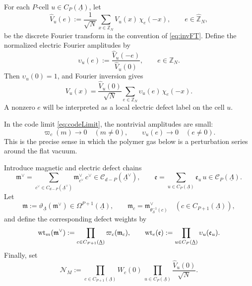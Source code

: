 For each \(P\)-cell \(u\in C_P(\underline\Lambda)\), let
\begin{equation}
	\widehat V_u(e)
	:=
	\frac{1}{\sqrt N}
	\sum_{x\in \mathbb Z_N}
	V_u(x)\,\chi_e(-x),
	\qquad
	e\in \widehat{\mathbb Z}_N,
	\label{eq:Vu-fourier-transform}
\end{equation}
be the discrete Fourier transform in the convention of \eqref{eq:invFT}. Define the normalized electric Fourier
amplitudes by
\begin{equation}
	\upsilon_u(e)
	:=
	\frac{\widehat V_u(-e)}{\widehat V_u(0)},
	\qquad
	e\in \mathbb Z_N.
	\label{eq:electric-local-amplitude}
\end{equation}
Then \(\upsilon_u(0)=1\), and Fourier inversion gives
\begin{equation}
	V_u(x)
	=
	\frac{\widehat V_u(0)}{\sqrt N}
	\sum_{e\in \mathbb Z_N}
	\upsilon_u(e)\,\chi_e(-x).
	\label{eq:V-cell-expansion}
\end{equation}
A nonzero \(e\) will be interpreted as a local electric defect label on the cell \(u\).

In the code limit \eqref{eq:codeLimit}, the nontrivial amplitudes are
small:
\begin{equation}
	\varpi_c(m)\rightarrow 0 \quad (m\neq 0),
	\qquad
	\upsilon_u(e)\rightarrow 0 \quad (e\neq 0).
	\label{eq:nontrivial-local-amplitudes-small}
\end{equation}
This is the precise sense in which the polymer gas below is a perturbation series around
the flat vacuum.

Introduce magnetic and electric defect chains
\begin{equation}
	\mathfrak m^\vee
	=
	\sum_{c^\vee\in C_{d-P}(\underline\Lambda^\vee)}
	\mathfrak m_{c^\vee}^\vee\,c^\vee
	\in \mathcal C_{d-P}(\underline\Lambda^\vee),
	\qquad
	\mathfrak e
	=
	\sum_{u\in C_P(\underline\Lambda)}
	\mathfrak e_u\,u
	\in \mathcal C_P(\underline\Lambda).
\end{equation}
Let
\begin{equation}
	\mathfrak m
	:=
	\vartheta_{\underline\Lambda}(\mathfrak m^\vee)\in \Omega^{P+1}(\underline\Lambda),
	\qquad
	\mathfrak m_c
	=
	\mathfrak m^\vee_{\theta_{\underline\Lambda}^{-1}(c)}
	\quad
	(c\in C_{P+1}(\underline\Lambda)),
\end{equation}
and define the corresponding defect weights by
\begin{equation}
	\mathrm{wt}_m(\mathfrak m^\vee)
	:=
	\prod_{c\in C_{P+1}(\underline\Lambda)}\varpi_c(\mathfrak m_c),
	\qquad
	\mathrm{wt}_e(\mathfrak e)
	:=
	\prod_{u\in C_P(\underline\Lambda)}\upsilon_u(\mathfrak e_u).
	\label{eq:local-defect-weights}
\end{equation}
Finally, set
\begin{equation}
	\mathcal N_M
	:=
	\prod_{c\in C_{P+1}(\underline\Lambda)}W_c(0)\,
	\prod_{u\in C_P(\underline\Lambda)}\frac{\widehat V_u(0)}{\sqrt N}.
	\label{eq:NM-fixed-charge}
\end{equation}

